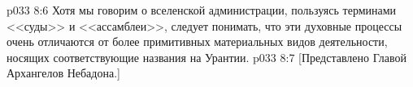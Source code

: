 \vs p033 8:6 Хотя мы говорим о вселенской администрации, пользуясь терминами <<суды>> и <<ассамблеи>>, следует понимать, что эти духовные процессы очень отличаются от более примитивных материальных видов деятельности, носящих соответствующие названия на Урантии.
\vsetoff
\vs p033 8:7 [Представлено Главой Архангелов Небадона.]
\quizlink
